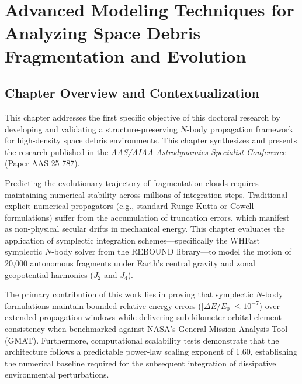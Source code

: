\chapter{Advanced Modeling Techniques for Analyzing Space Debris Fragmentation and Evolution}
\label{ch:paper1}

\section*{Chapter Overview and Contextualization}
This chapter addresses the first specific objective of this doctoral research by developing and validating a structure-preserving $N$-body propagation framework for high-density space debris environments. This chapter synthesizes and presents the research published in the \textit{AAS/AIAA Astrodynamics Specialist Conference} (Paper AAS 25-787).

Predicting the evolutionary trajectory of fragmentation clouds requires maintaining numerical stability across millions of integration steps. Traditional explicit numerical propagators (e.g., standard Runge-Kutta or Cowell formulations) suffer from the accumulation of truncation errors, which manifest as non-physical secular drifts in mechanical energy. This chapter evaluates the application of symplectic integration schemes---specifically the WHFast symplectic $N$-body solver from the REBOUND library---to model the motion of 20,000 autonomous fragments under Earth's central gravity and zonal geopotential harmonics ($J_2$ and $J_4$).

The primary contribution of this work lies in proving that symplectic $N$-body formulations maintain bounded relative energy errors ($|\Delta E/E_0| \le 10^{-7}$) over extended propagation windows while delivering sub-kilometer orbital element consistency when benchmarked against NASA's General Mission Analysis Tool (GMAT). Furthermore, computational scalability tests demonstrate that the architecture follows a predictable power-law scaling exponent of 1.60, establishing the numerical baseline required for the subsequent integration of dissipative environmental perturbations.

\newpage
% 

